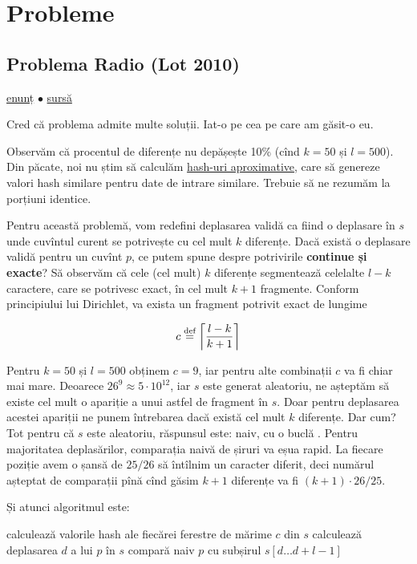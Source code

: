 \documentclass[../main.tex]{subfiles}
\begin{document}
\section{Probleme}

\subsection{Problema Radio (Lot 2010)}
\label{problem:radio}

\href{https://kilonova.ro/problems/2273}{enunț}
$\bullet$
\hyperref[code:radio]{sursă}

Cred că problema admite multe soluții. Iat-o pe cea pe care am găsit-o eu.

Observăm că procentul de diferențe nu depășește 10\% (cînd $k = 50$ și $l = 500$). Din păcate, noi nu știm să calculăm \href{https://en.wikipedia.org/wiki/Locality-sensitive_hashing}{hash-uri aproximative}, care să genereze valori hash similare pentru date de intrare similare. Trebuie să ne rezumăm la porțiuni identice.

Pentru această problemă, vom redefini deplasarea validă ca fiind o deplasare în $s$ unde cuvîntul curent se potrivește cu cel mult $k$ diferențe. Dacă există o deplasare validă pentru un cuvînt $p$, ce putem spune despre potrivirile \textbf{continue și exacte}? Să observăm că cele (cel mult) $k$ diferențe segmentează celelalte $l - k$ caractere, care se potrivesc exact, în cel mult $k+1$ fragmente. Conform principiului lui Dirichlet, va exista un fragment potrivit exact de lungime

$$c \stackrel{\text{def}}{=} \left\lceil \frac{l - k}{k + 1} \right\rceil$$

Pentru $k = 50$ și $l = 500$ obținem $c = 9$, iar pentru alte combinații $c$ va fi chiar mai mare. Deoarece $26^9 \approx 5 \cdot 10^{12}$, iar $s$ este generat aleatoriu, ne așteptăm să existe cel mult o apariție a unui astfel de fragment în $s$. Doar pentru deplasarea acestei apariții ne punem întrebarea dacă există cel mult $k$ diferențe. Dar cum? Tot pentru că $s$ este aleatoriu, răspunsul este: naiv, cu o buclă . Pentru majoritatea deplasărilor, comparația naivă de șiruri va eșua rapid. La fiecare poziție avem o șansă de $25/26$ să întîlnim un caracter diferit, deci numărul așteptat de comparații pînă cînd găsim $k+1$ diferențe va fi $(k + 1) \cdot 26/25$.

Și atunci algoritmul este:

\begin{algorithm}[H]
  \caption{Algoritmul în ansamblu pentru problema Radio}
  \begin{algorithmic}[1]
    \State calculează valorile hash ale fiecărei ferestre de mărime $c$ din $s$
          \State calculează deplasarea $d$ a lui $p$ în $s$
          \State compară naiv $p$ cu subșirul $s[d \dots d + l - 1]$
        \EndFor
      \EndFor
    \EndFor
  \end{algorithmic}
\end{algorithm}
\end{document}
